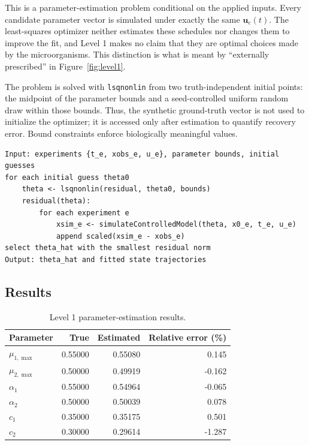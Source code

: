 \documentclass[11pt,a4paper]{article}
\newcommand{\vect}[1]{\boldsymbol{#1}}
\begin{document}
This is a parameter-estimation problem conditional on the applied inputs.
Every candidate parameter vector is simulated under exactly the same
\(\vect{u}_e(t)\). The least-squares optimizer neither estimates these
schedules nor changes them to improve the fit, and Level 1 makes no claim
that they are optimal choices made by the microorganisms. This distinction
is what is meant by ``externally prescribed'' in Figure~\ref{fig:level1}.

The problem is solved with \texttt{lsqnonlin} from two truth-independent
initial points: the midpoint of the parameter bounds and a seed-controlled
uniform random draw within those bounds. Thus, the synthetic ground-truth
vector is not used to initialize the optimizer; it is accessed only after
estimation to quantify recovery error. Bound constraints enforce biologically
meaningful values.

\noindent\begin{minipage}{\linewidth}
\begin{lstlisting}[style=pseudostyle,title={Compact MATLAB pseudocode}]
Input: experiments {t_e, xobs_e, u_e}, parameter bounds, initial guesses
for each initial guess theta0
    theta <- lsqnonlin(residual, theta0, bounds)
    residual(theta):
        for each experiment e
            xsim_e <- simulateControlledModel(theta, x0_e, t_e, u_e)
            append scaled(xsim_e - xobs_e)
select theta_hat with the smallest residual norm
Output: theta_hat and fitted state trajectories
\end{lstlisting}
\end{minipage}

\subsection{Results}

\begin{table}[H]
\centering
\caption{Level 1 parameter-estimation results.}
\label{tab:level1}
\begin{tabular}{lrrr}
\toprule
Parameter & True & Estimated & Relative error (\%)\\
\midrule
\(\mu_{1,\max}\) & 0.55000 & 0.55080 &  0.145\\
\(\mu_{2,\max}\) & 0.50000 & 0.49919 & -0.162\\
\(\alpha_1\)     & 0.55000 & 0.54964 & -0.065\\
\(\alpha_2\)     & 0.50000 & 0.50039 &  0.078\\
\(c_1\)          & 0.35000 & 0.35175 &  0.501\\
\(c_2\)          & 0.30000 & 0.29614 & -1.287\\
\bottomrule
\end{tabular}
\end{table}
\end{document}
